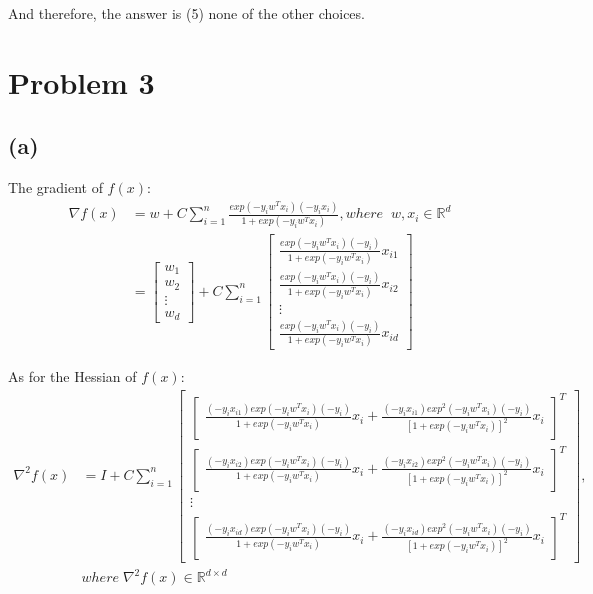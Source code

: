 \documentclass[a4paper,12pt]{article}
\begin{document}
And therefore, the answer is (5) none of the other choices.

\section*{Problem 3}

\subsection*{(a)}
\noindent The gradient of $f(x)$:
\begin{align*}
   \nabla f(x) &= w + C \sum_{i=1}^{n} \frac{ exp(-y_i w^T x_i)(-y_i x_i)}{1+exp(-y_i w^T x_i)}, 
   where \;\; w, x_i \in \mathbb{R}^d \\
   &= \begin{bmatrix} w_1 \\ w_2 \\ \vdots \\ w_d \end{bmatrix} +
   C \sum_{i=1}^{n} 
   \begin{bmatrix}
      \frac{ exp(-y_i w^T x_i)(-y_i)}{1+exp(-y_i w^T x_i)} x_{i1} \\
      \frac{ exp(-y_i w^T x_i)(-y_i)}{1+exp(-y_i w^T x_i)} x_{i2} \\
      \vdots \\
      \frac{ exp(-y_i w^T x_i)(-y_i)}{1+exp(-y_i w^T x_i)} x_{id}
   \end{bmatrix}
\end{align*}

\noindent As for the Hessian of $f(x)$:
\begin{align*}
   \nabla^2 f(x) &= I + C \sum_{i=1}^{n}
   \begin{bmatrix}
      \begin{bmatrix}
         \frac{(-y_i x_{i1}) exp(-y_i w^T x_i) (-y_i)}{1+exp(-y_i w^T x_i)} x_i
         + \frac{(-y_i x_{i1}) exp^2(-y_i w^T x_i)(-y_i)}{[1+exp(-y_i w^T x_i)]^2}x_i
      \end{bmatrix}^{T}
      \\
      \begin{bmatrix}
         \frac{(-y_i x_{i2}) exp(-y_i w^T x_i) (-y_i)}{1+exp(-y_i w^T x_i)} x_i
         + \frac{(-y_i x_{i2}) exp^2(-y_i w^T x_i)(-y_i)}{[1+exp(-y_i w^T x_i)]^2}x_i
      \end{bmatrix}^{T}
      \\
      \vdots
      \\
      \begin{bmatrix}
         \frac{(-y_i x_{id}) exp(-y_i w^T x_i) (-y_i)}{1+exp(-y_i w^T x_i)} x_i
         + \frac{(-y_i x_{id}) exp^2(-y_i w^T x_i)(-y_i)}{[1+exp(-y_i w^T x_i)]^2}x_i
      \end{bmatrix}^{T}
   \end{bmatrix},
   \\
   & where \; \nabla^2 f(x) \in \mathbb{R}^{d \times d}
\end{align*}
\end{document}
